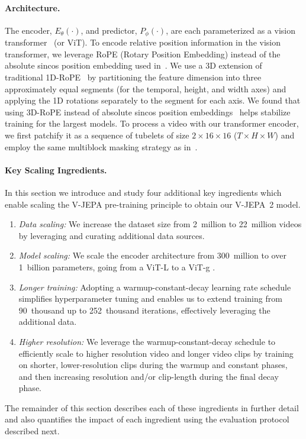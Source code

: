 \documentclass[]{kling/kling}
\newcommand{\model}{V-JEPA~2\xspace}
\begin{document}
\paragraph{\bf Architecture.} The encoder, $E_\theta(\cdot)$, and predictor, $P_\phi(\cdot)$, are each parameterized as a vision transformer~\citep{dosovitskiy2020image} (or ViT).
To encode relative position information in the vision transformer, we leverage RoPE (Rotary Position Embedding) instead of the absolute sincos position embedding used in~\citet{bardes2024revisiting}. We use a 3D extension of traditional 1D-RoPE~\citep{su2024roformer} by partitioning the feature dimension into three approximately equal segments (for the temporal, height, and width axes) and applying the 1D rotations separately to the segment for each axis.
We found that using 3D-RoPE instead of absolute sincos position embeddings~\citep{vaswani2017attention} helps stabilize training for the largest models.
To process a video with our transformer encoder, we first patchify it as a sequence of tubelets of size $2\times16\times16$ ($T\times H\times W$) and employ the same multiblock masking strategy as in~\citet{bardes2024revisiting}.

\paragraph{\bf Key Scaling Ingredients.} In this section we introduce and study four additional key ingredients which enable scaling the V-JEPA pre-training principle to obtain our \model model.
\begin{enumerate}
\item \emph{Data scaling:} We increase the dataset size from 2~million to 22~million videos by leveraging and curating additional data sources.

\item \emph{Model scaling:} We scale the encoder architecture from 300~million to over 1~billion parameters, going from a ViT-L to a ViT-g \citep{zhai2022scaling}.

\item \emph{Longer training:} Adopting a warmup-constant-decay learning rate schedule simplifies hyperparameter tuning and enables us to extend training from 90~thousand up to 252~thousand iterations, effectively leveraging the additional data.

\item \emph{Higher resolution:} We leverage the warmup-constant-decay schedule to efficiently scale to higher resolution video and longer video clips by training on shorter, lower-resolution clips during the warmup and constant phases, and then increasing resolution and/or clip-length during the final decay phase.
\end{enumerate}
The remainder of this section describes each of these ingredients in further detail and also quantifies the impact of each ingredient using the evaluation protocol described next.
\end{document}
